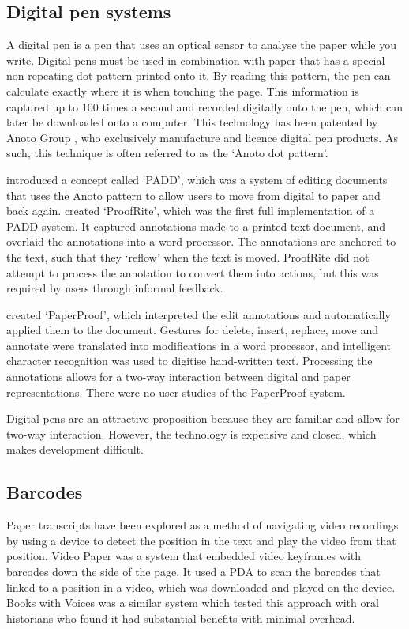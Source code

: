 \subsection{Digital pen systems}
A digital pen is a pen that uses an optical sensor to analyse the paper while you write. Digital pens must be used in
combination with paper that has a special non-repeating dot pattern printed onto it. By reading this pattern, the pen
can calculate exactly where it is when touching the page. This information is captured up to 100 times a second
and recorded digitally onto the pen, which can later be downloaded onto a computer. This technology has been patented
by Anoto Group \citep{Fahraeus2003}, who exclusively manufacture and licence digital pen products. As such, this
technique is often referred to as the `Anoto dot pattern'.

\citet{Guimbretiere2003} introduced a concept called `PADD', which was a system of editing documents that uses the
Anoto pattern to allow users to move from digital to paper and back again. \citet{Conroy2004} created `ProofRite',
which was the first full implementation of a PADD system. It captured annotations made to a printed text document, and
overlaid the annotations into a word processor. The annotations are anchored to the text, such that they `reflow' when
the text is moved.  ProofRite did not attempt to process the annotation to convert them into actions, but this was
required by users through informal feedback.

\citet{Weibel2008} created `PaperProof', which interpreted the edit annotations and automatically applied them to the
document. Gestures for delete, insert, replace, move and annotate were translated into modifications in a word
processor, and intelligent character recognition was used to digitise hand-written text. Processing the annotations
allows for a two-way interaction between digital and paper representations. There were no user studies of the
PaperProof system.

Digital pens are an attractive proposition because they are familiar and allow for two-way interaction. However, the
technology is expensive and closed, which makes development difficult.

\subsection{Barcodes}
Paper transcripts have been explored as a method of navigating video recordings by using a device to detect the
position in the text and play the video from that position. Video Paper \citep{Hull2003} was a system that embedded
video keyframes with barcodes down the side of the page. It used a PDA to scan the barcodes that linked to a position
in a video, which was downloaded and played on the device.  Books with Voices \citep{Klemmer2003} was a similar system
which tested this approach with oral historians who found it had substantial benefits with minimal overhead.

